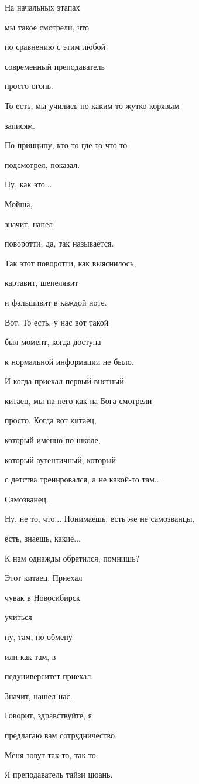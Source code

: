 На начальных этапах

мы такое смотрели, что

по сравнению с этим любой

современный преподаватель

просто огонь.

То есть, мы учились по каким-то жутко корявым

записям.

По принципу, кто-то где-то что-то

подсмотрел, показал.

Ну, как это...

Мойша,

значит, напел

поворотти, да, так называется.

Так этот поворотти, как выяснилось,

картавит, шепелявит

и фальшивит в каждой ноте.

Вот. То есть, у нас вот такой

был момент, когда доступа

к нормальной информации не было.

И когда приехал первый внятный

китаец, мы на него как на Бога смотрели

просто. Когда вот китаец,

который именно по школе,

который аутентичный, который

с детства тренировался, а не какой-то там...

Самозванец.

Ну, не то, что... Понимаешь, есть же не самозванцы,

есть, знаешь, какие...

К нам однажды обратился, помнишь?

Этот китаец. Приехал

чувак в Новосибирск

учиться

ну, там, по обмену

или как там, в

педуниверситет приехал.

Значит, нашел нас.

Говорит, здравствуйте, я

предлагаю вам сотрудничество.

Меня зовут так-то, так-то.

Я преподаватель тайзи цюань.

